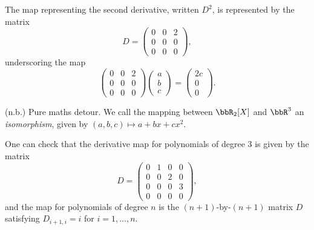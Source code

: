 \documentclass[a4paper, 12pt,oneside,openany]{book}
\begin{document}
{The map representing the second derivative, written $D^2$, is represented by the matrix $$D=\begin{pmatrix} 0&0&2\\0&0&0\\0&0&0 \end{pmatrix},$$ underscoring the map $$\begin{pmatrix} 0&0&2\\0&0&0\\0&0&0 \end{pmatrix} \begin{pmatrix} a\\b\\c \end{pmatrix} = \begin{pmatrix} 2c\\0\\0 \end{pmatrix}.$$

(n.b.) Pure maths detour. We call the mapping between $\bbR_2[X]$ and $\bbR^3$ an \emph{isomorphism}, given by $(a, b, c) \mapsto a+bx+cx^2$.
}

One can check that the derivative map for polynomials of degree 3 is given by the matrix $$D=\begin{pmatrix} 0&1&0&0\\0&0&2&0\\0&0&0&3\\0&0&0&0 \end{pmatrix},$$ and the map for polynomials of degree $n$ is the $(n+1)$-by-$(n+1)$ matrix $D$ satisfying $D_{i+1, i}=i$ for $i=1, \dots, n$. 

\end{document}

